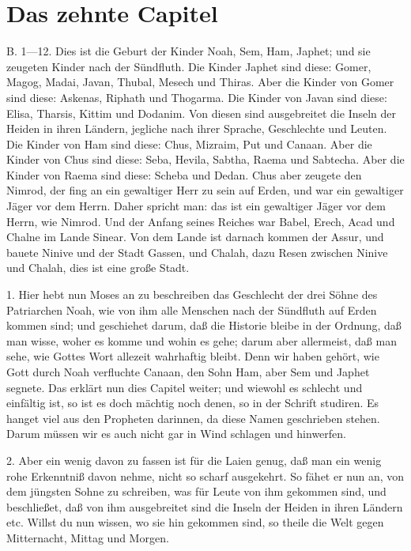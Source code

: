 \section{Das zehnte Capitel}

B. 1—12. Dies ist die Geburt der Kinder Noah, Sem, Ham, Japhet; und sie zeugeten Kinder nach der Sündfluth. Die Kinder Japhet sind diese: Gomer, Magog, Madai, Javan, Thubal, Mesech und Thiras. Aber die Kinder von Gomer sind diese: Askenas, Riphath und Thogarma. Die Kinder von Javan sind diese: Elisa, Tharsis, Kittim und Dodanim. Von diesen sind ausgebreitet die Inseln der Heiden in ihren Ländern, jegliche nach ihrer Sprache, Geschlechte und Leuten. Die Kinder von Ham sind diese: Chus, Mizraim, Put und Canaan. Aber die Kinder von Chus sind diese: Seba, Hevila, Sabtha, Raema und Sabtecha. Aber die Kinder von Raema sind diese: Scheba und Dedan. Chus aber zeugete den Nimrod, der fing an ein gewaltiger Herr zu sein auf Erden, und war ein gewaltiger Jäger vor dem Herrn. Daher spricht man: das ist ein gewaltiger Jäger vor dem Herrn, wie Nimrod. Und der Anfang seines Reiches war Babel, Erech, Acad und Chalne im Lande Sinear. Von dem Lande ist darnach kommen der Assur, und bauete Ninive und der Stadt Gassen, und Chalah, dazu Resen zwischen Ninive und Chalah, dies ist eine große Stadt.

1. Hier hebt nun Moses an zu beschreiben das Geschlecht der drei Söhne des Patriarchen Noah, wie von ihm alle Menschen nach der Sündfluth auf Erden kommen sind; und geschiehet darum, daß die Historie bleibe in der Ordnung, daß man wisse, woher es komme und wohin es gehe; darum aber allermeist, daß man sehe, wie Gottes Wort allezeit wahrhaftig bleibt. Denn wir haben gehört, wie Gott durch Noah verfluchte Canaan, den Sohn Ham, aber Sem und Japhet segnete. Das erklärt nun dies Capitel weiter; und wiewohl es schlecht und einfältig ist, so ist es doch mächtig noch denen, so in der Schrift studiren. Es hanget viel aus den Propheten darinnen, da diese Namen geschrieben stehen. Darum müssen wir es auch nicht gar in Wind schlagen und hinwerfen.

2. Aber ein wenig davon zu fassen ist für die Laien genug, daß man ein wenig rohe Erkenntniß davon nehme, nicht so scharf ausgekehrt. So fähet er nun an, von dem jüngsten Sohne zu schreiben, was für Leute von ihm gekommen sind, und beschließet, daß von ihm ausgebreitet sind die Inseln der Heiden in ihren Ländern etc. Willst du nun wissen, wo sie hin gekommen sind, so theile die Welt gegen Mitternacht, Mittag und Morgen.

